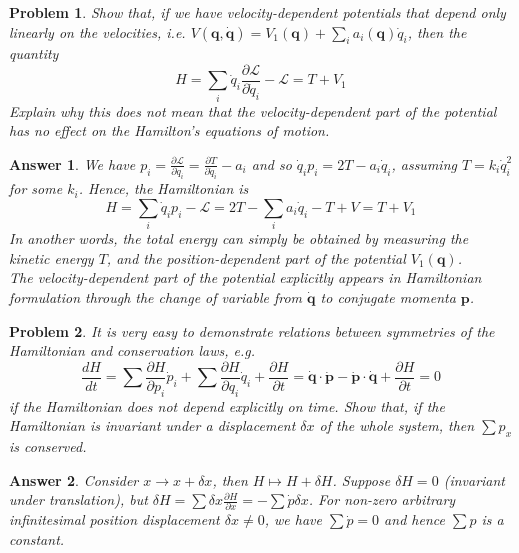 \documentclass[a4paper]{article}
\newtheorem{ans}{Answer}[section]
\theoremstyle{new}
\newtheorem{qns}{Problem}[section]
\begin{document}
\begin{qns}
Show that, if we have velocity-dependent potentials that depend only linearly on the velocities, i.e. $V(\mathbf{q},\mathbf{\dot{q}})=V_1(\mathbf{q})+\sum_ia_i(\mathbf{q})\dot{q}_i$, then the quantity
$$H=\sum_i\dot{q}_i\frac{\partial\mathcal{L}}{\partial\dot{q}_i}-\mathcal{L}=T+V_1$$
Explain why this does not mean that the velocity-dependent part of the potential has no effect on the Hamilton's equations of motion.
\end{qns}
\begin{ans}
We have $p_i=\frac{\partial\mathcal{L}}{\partial\dot{q}_i}=\frac{\partial T}{\partial\dot{q}_i}-a_i$ and so $\dot{q}_ip_i=2T-a_i\dot{q}_i$, assuming $T=k_i\dot{q}_i^2$ for some $k_i$. Hence, the Hamiltonian is
$$H=\sum_i\dot{q}_ip_i-\mathcal{L}=2T-\sum_i a_i\dot{q}_i-T+V=T+V_1$$
In another words, the total energy can simply be obtained by measuring the kinetic energy $T$, and the position-dependent part of the potential $V_1(\mathbf{q})$.\\[5pt]
The velocity-dependent part of the potential explicitly appears in Hamiltonian formulation through the change of variable from $\mathbf{\dot{q}}$ to conjugate momenta $\mathbf{p}$.
\end{ans}
\begin{qns}
It is very easy to demonstrate relations between symmetries of the Hamiltonian and conservation laws, e.g.
$$\frac{dH}{dt}=\sum\frac{\partial H}{\partial p_i}\dot{p}_i+\sum\frac{\partial H}{\partial q_i}\dot{q}_i+\frac{\partial H}{\partial t}=\mathbf{\dot{q}}\cdot\mathbf{\dot{p}}-\mathbf{\dot{p}}\cdot\mathbf{\dot{q}}+\frac{\partial H}{\partial t}=0$$
if the Hamiltonian does not depend explicitly on time. Show that, if the Hamiltonian is invariant under a displacement $\delta x$ of the whole system, then $\sum p_x$ is conserved.
\end{qns}
\begin{ans}
Consider $x\rightarrow x+\delta x$, then $H\mapsto H+\delta H$. Suppose $\delta H=0$ (invariant under translation), but $\delta H=\sum\delta x\frac{\partial H}{\partial x}=-\sum\dot{p}\delta x$. For non-zero arbitrary infinitesimal position displacement $\delta x\neq 0$, we have $\sum\dot{p}=0$ and hence $\sum p$ is a constant.
\end{ans}
\newpage
\end{document}
